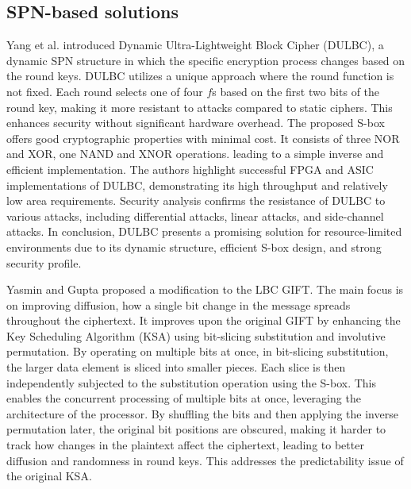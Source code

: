 \documentclass[conference]{IEEEtran}
\begin{document}
\subsection{SPN-based solutions}

Yang et al. introduced Dynamic Ultra-Lightweight Block Cipher (DULBC), a dynamic SPN structure in which the specific encryption process changes based on the round keys. DULBC utilizes a unique approach where the round function is not fixed. Each round selects one of four $f$s based on the first two bits of the round key, making it more resistant to attacks compared to static ciphers. This enhances security without significant hardware overhead. The proposed S-box offers good cryptographic properties with minimal cost. It consists of three NOR and XOR, one NAND and XNOR operations. leading to a simple inverse and efficient implementation. The authors highlight successful FPGA and ASIC implementations of DULBC, demonstrating its high throughput and relatively low area requirements. Security analysis confirms the resistance of DULBC to various attacks, including differential attacks, linear attacks, and side-channel attacks. In conclusion, DULBC presents a promising solution for resource-limited environments due to its dynamic structure, efficient S-box design, and strong security profile\cite{DULBC}.


Yasmin and Gupta proposed a modification to the LBC GIFT\cite{GIFT}. The main focus is on improving diffusion, how a single bit change in the message spreads throughout the ciphertext. It improves upon the original GIFT by enhancing the Key Scheduling Algorithm (KSA) using bit-slicing substitution and involutive permutation. By operating on multiple bits at once, in bit-slicing substitution, the larger data element is sliced into smaller pieces. Each slice is then independently subjected to the substitution operation using the S-box. This enables the concurrent processing of multiple bits at once, leveraging the architecture of the processor. By shuffling the bits and then applying the inverse permutation later, the original bit positions are obscured, making it harder to track how changes in the plaintext affect the ciphertext, leading to better diffusion and randomness in round keys. This addresses the predictability issue of the original KSA\cite{yasmin2023modified}.
\end{document}

